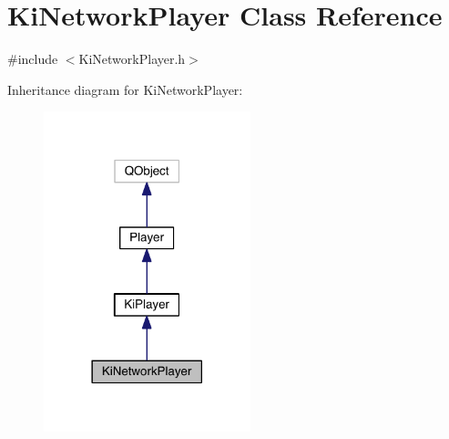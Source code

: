 \hypertarget{class_ki_network_player}{\section{Ki\+Network\+Player Class Reference}
\label{class_ki_network_player}
}


{\ttfamily \#include $<$Ki\+Network\+Player.\+h$>$}



Inheritance diagram for Ki\+Network\+Player\+:\nopagebreak
\begin{figure}[H]
\begin{center}
\leavevmode
\includegraphics[width=170pt]{class_ki_network_player__inherit__graph}
\end{center}
\end{figure}


